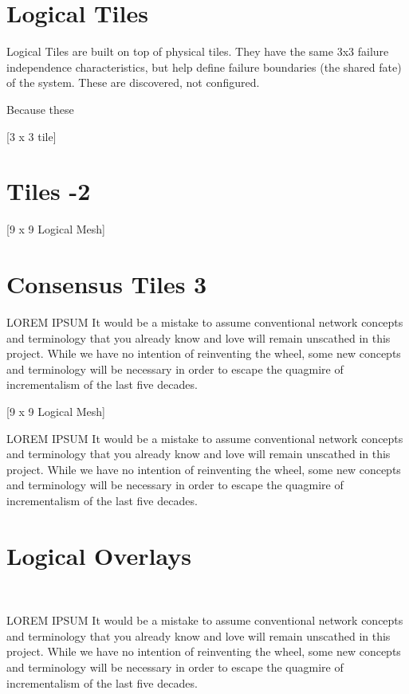 \documentclass[../../../OAE-SPEC-MAIN.tex]{subfiles}
\begin{document}
\section{Logical Tiles}

Logical Tiles are built on top of physical tiles.  They have the same 3x3 failure independence characteristics, but help define failure boundaries (the shared fate) of the system. These are discovered, not configured.  

Because these 


[3 x 3 tile]

\section{Tiles -2}

[9 x 9 Logical Mesh]

\section{Consensus Tiles 3}

LOREM IPSUM It would be a mistake to assume conventional network concepts and terminology that you already know and love will remain unscathed in this project. While we have no intention of reinventing the wheel,  some new concepts and terminology will be necessary in order to escape the quagmire of incrementalism of the last five decades.  

[9 x 9 Logical Mesh]

LOREM IPSUM It would be a mistake to assume conventional network concepts and terminology that you already know and love will remain unscathed in this project. While we have no intention of reinventing the wheel,  some new concepts and terminology will be necessary in order to escape the quagmire of incrementalism of the last five decades.  

\section{Logical Overlays}\

LOREM IPSUM It would be a mistake to assume conventional network concepts and terminology that you already know and love will remain unscathed in this project. While we have no intention of reinventing the wheel,  some new concepts and terminology will be necessary in order to escape the quagmire of incrementalism of the last five decades.  
\end{document}
